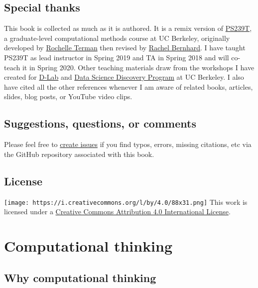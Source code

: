 \documentclass[
]{book}
\begin{document}
\hypertarget{special-thanks}{%
\section{Special thanks}\label{special-thanks}}

This book is collected as much as it is authored. It is a remix version of \href{https://github.com/rochelleterman/PS239T}{PS239T}, a graduate-level computational methods course at UC Berkeley, originally developed by \href{http://rochelleterman.com/}{Rochelle Terman} then revised by \href{http://rachelbernhard.com/}{Rachel Bernhard}. I have taught PS239T as lead instructor in Spring 2019 and TA in Spring 2018 and will co-teach it in Spring 2020. Other teaching materials draw from the workshops I have created for \href{https://dlab.berkeley.edu/}{D-Lab} and \href{https://data.berkeley.edu/research/discovery-program-home}{Data Science Discovery Program} at UC Berkeley. I also have cited all the other references whenever I am aware of related books, articles, slides, blog posts, or YouTube video clips.

\hypertarget{suggestions-questions-or-comments}{%
\section{Suggestions, questions, or comments}\label{suggestions-questions-or-comments}}

Please feel free to \href{https://github.com/jaeyk/PS239T/issues}{create issues} if you find typos, errors, missing citations, etc via the GitHub repository associated with this book.

\hypertarget{license}{%
\section{License}\label{license}}

\texttt{[image: https://i.creativecommons.org/l/by/4.0/88x31.png]} This work is licensed under a \href{https://creativecommons.org/licenses/by/4.0/}{Creative Commons Attribution 4.0 International License}.

\hypertarget{motivation}{%
\chapter{Computational thinking}\label{motivation}}

\hypertarget{why-computational-thinking}{%
\section{Why computational thinking}\label{why-computational-thinking}}
\end{document}
